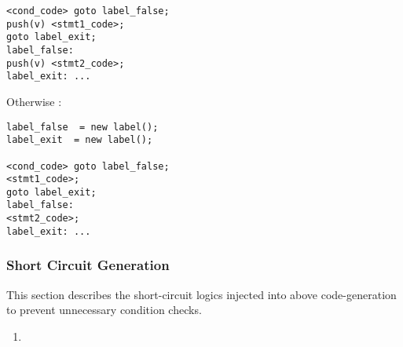 \documentclass[12pt]{article}
\begin{document}
\begin{enumerate}
\begin{verbatim}
<cond_code> goto label_false;
push(v) <stmt1_code>;
goto label_exit;
label_false:
push(v) <stmt2_code>;
label_exit: ...
\end{verbatim}

Otherwise :  
\begin{verbatim}
label_false  = new label();
label_exit  = new label();

<cond_code> goto label_false;
<stmt1_code>;
goto label_exit;
label_false:
<stmt2_code>;
label_exit: ...
\end{verbatim}
\end{enumerate}

\subsubsection{Short Circuit Generation}
This section describes the short-circuit logics injected into above code-generation to prevent unnecessary condition checks.

\begin{enumerate}
\item
\end{enumerate}
\end{document}
